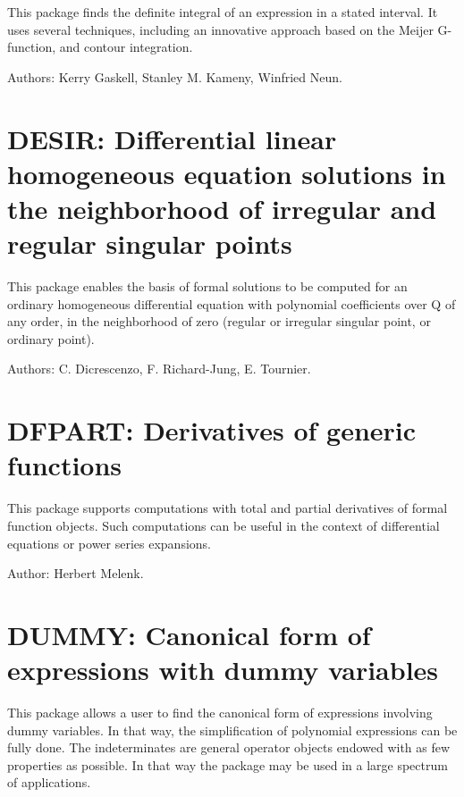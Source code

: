 This package finds the definite integral of an expression in a stated
interval.  It uses several techniques, including an innovative approach
based on the Meijer G-function, and contour integration.

Authors: Kerry Gaskell, Stanley M. Kameny, Winfried Neun.



\newpage

\section{DESIR: Differential linear homogeneous equation solutions in the
              neighborhood of irregular and regular singular points}

This package enables the basis of formal solutions to be computed for an
ordinary homogeneous differential equation with polynomial coefficients
over Q of any order, in the neighborhood of zero (regular or irregular
singular point, or ordinary point).

Authors: C. Dicrescenzo, F. Richard-Jung, E. Tournier.



\newpage

\section{DFPART: Derivatives of generic functions}

This package supports computations with total and partial derivatives of
formal function objects.  Such computations can be useful in the context
of differential equations or power series expansions.

Author: Herbert Melenk.



\newpage

\section{DUMMY: Canonical form of expressions with dummy variables}

This package allows a user to find the canonical form of expressions
involving dummy variables. In that way, the simplification of
polynomial expressions can be fully done. The indeterminates are general
operator objects endowed with as few properties as possible. In that way
the package may be used in a large spectrum of applications.

